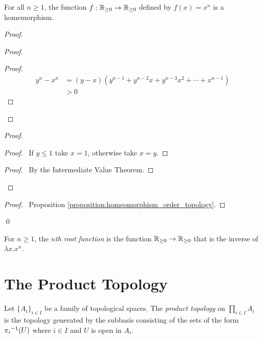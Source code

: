 \begin{proposition}
    For all $n \geq 1$, the function $f : \mathbb{R}_{\geq 0} \rightarrow \mathbb{R}_{\geq 0}$ defined by $f(x) = x^n$ is a homemorphism.
\end{proposition}

\begin{proof}
    \pf
    \begin{proof}
        \begin{proof}
            \begin{align*}
                y^n - x^n & = (y - x)(y^{n-1} + y^{n-2}x + y^{n-3}x^2 + \cdots + x^{n-1}) \\
                & > 0
            \end{align*}
        \end{proof}
    \end{proof}
    \begin{proof}
        \begin{proof}
            \pf\ If $y \leq 1$ take $x = 1$, otherwise take $x = y$.
        \end{proof}
        \begin{proof}
            \pf\ By the Intermediate Value Theorem.
        \end{proof}
    \end{proof}
    \qedstep
    \begin{proof}
        \pf\ Proposition \ref{proposition:homeomorphism_order_topology}.
    \end{proof}
    \qed
\end{proof}

\begin{definition}
    For $n \geq 1$, the \emph{$n$th root function} is the function $\mathbb{R}_{\geq 0} \rightarrow \mathbb{R}_{\geq 0}$ that is the inverse of $\lambda x.x^n$.
\end{definition}

\section{The Product Topology}

\begin{definition}
    Let $\{ A_i \}_{i \in I}$ be a family of topological spaces. The \emph{product topology} on $\prod_{i \in I} A_i$
    is the topology generated by the subbasis consisting of the sets of the form ${\pi_i}^{-1}(U)$ where $i \in I$
    and $U$ is open in $A_i$.
\end{definition}

